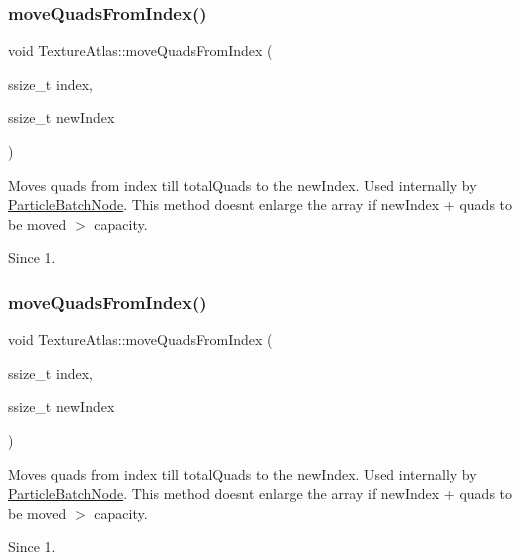 \subsubsection{\texorpdfstring{move\+Quads\+From\+Index()}{moveQuadsFromIndex()}\hspace{0.1cm}{\footnotesize\ttfamily [3/4]}}
{\footnotesize\ttfamily void Texture\+Atlas\+::move\+Quads\+From\+Index (\begin{DoxyParamCaption}\item[{ssize\+\_\+t}]{index,  }\item[{ssize\+\_\+t}]{new\+Index }\end{DoxyParamCaption})}

Moves quads from index till total\+Quads to the new\+Index. Used internally by \hyperlink{classParticleBatchNode}{Particle\+Batch\+Node}. This method doesn\textquotesingle{}t enlarge the array if new\+Index + quads to be moved $>$ capacity. \begin{DoxySince}{Since}
1. 
\end{DoxySince}
\mbox{\label{classTextureAtlas_aa4fb28570142da6c7a47aba59a4f021b}} 
\subsubsection{\texorpdfstring{move\+Quads\+From\+Index()}{moveQuadsFromIndex()}\hspace{0.1cm}{\footnotesize\ttfamily [4/4]}}
{\footnotesize\ttfamily void Texture\+Atlas\+::move\+Quads\+From\+Index (\begin{DoxyParamCaption}\item[{ssize\+\_\+t}]{index,  }\item[{ssize\+\_\+t}]{new\+Index }\end{DoxyParamCaption})}

Moves quads from index till total\+Quads to the new\+Index. Used internally by \hyperlink{classParticleBatchNode}{Particle\+Batch\+Node}. This method doesn\textquotesingle{}t enlarge the array if new\+Index + quads to be moved $>$ capacity. \begin{DoxySince}{Since}
1. 
\end{DoxySince}
\mbox{\label{classTextureAtlas_aff17a9d95e8b279381d4b4820d0893f4}} 
